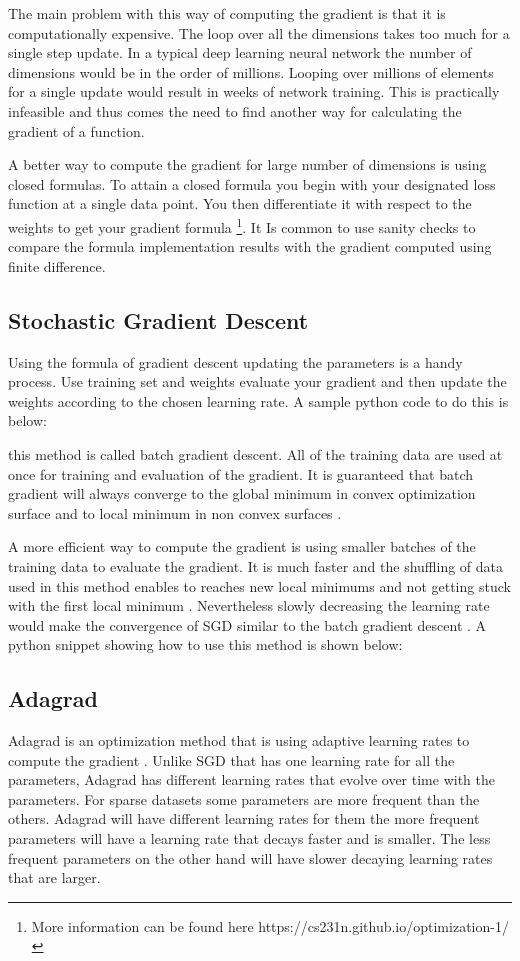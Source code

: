 \documentclass[12pt,twoside]{article}
\theoremstyle{plain}
\theoremstyle{definition}
\theoremstyle{remark}
\begin{document}


The main problem with this way of computing the gradient is that it is computationally expensive. The loop over all the dimensions takes too much for a single step update. In a typical deep learning neural network the number of dimensions would be in the order of millions. Looping over millions of elements for a single update would result in weeks of network training. This is practically infeasible and thus comes the need to find another way for calculating the gradient of a function. 

A better way to compute the gradient for large number of dimensions is using closed formulas. To attain a closed formula you begin with your designated loss function at a single data point. You then differentiate it with respect to the weights to get your gradient formula \cite{Qian99onthe} \footnote{More information can be found here https://cs231n.github.io/optimization-1/}. It Is common to use sanity checks to compare the formula implementation results with the gradient computed using finite difference.

\subsection{Stochastic Gradient Descent}
Using the formula of gradient descent updating the parameters is a handy process. Use training set and weights evaluate your gradient and then update the weights according to the chosen learning rate. A sample python code to do this is below:

this method is called batch gradient descent. All of the training data are used at once for training and evaluation of the gradient. It is guaranteed that batch gradient will always converge to the global minimum in convex optimization surface and to local minimum in non convex surfaces \cite{Ruder16}.

A more efficient way to compute the gradient is using smaller batches of the training data to evaluate the gradient. It is much faster and the shuffling of data used in this method enables to reaches new local minimums and not getting stuck with the first local minimum \cite{Ruder16}. Nevertheless slowly decreasing the learning rate would make the convergence of SGD similar to the batch gradient descent \cite{Ruder16}. A python snippet showing how to use this method is shown below:

\subsection{Adagrad}
Adagrad is an optimization method that is using adaptive learning rates to compute the gradient \cite{Duchi2011}. Unlike SGD that has one learning rate for all the parameters, Adagrad has different learning rates that evolve over time with the parameters. For sparse datasets some parameters are more frequent than the others. Adagrad will have different learning rates for them the more frequent parameters will have a learning rate that decays faster and is smaller. The less frequent parameters on the other hand will have slower decaying learning rates that are larger.
\end{document}
